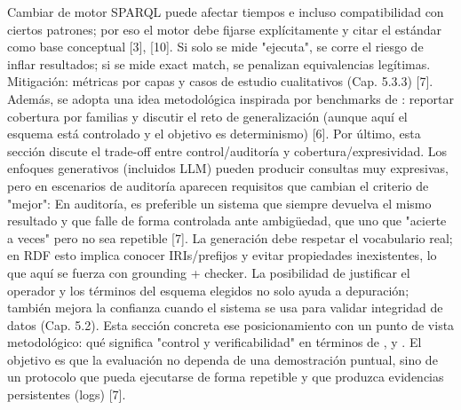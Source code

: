 \markdownRendererUlItem {} Cambiar de motor SPARQL puede afectar tiempos e incluso compatibilidad con ciertos patrones; por eso el motor debe fijarse explícitamente y citar el estándar como base conceptual [3], [10].\markdownRendererUlItemEnd 
\markdownRendererUlItem {} Si solo se mide "ejecuta", se corre el riesgo de inflar resultados; si se mide exact match, se penalizan equivalencias legítimas. Mitigación: métricas por capas y casos de estudio cualitativos (Cap. 5.3.3) [7].\markdownRendererUlItemEnd 
\markdownRendererUlEndTight \markdownRendererInterblockSeparator
{}Además, se adopta una idea metodológica inspirada por benchmarks de : reportar cobertura por familias y discutir el reto de generalización (aunque aquí el esquema está controlado y el objetivo es determinismo) [6].\markdownRendererInterblockSeparator
{}\markdownRendererInterblockSeparator
{}Por último, esta sección discute el trade-off entre control/auditoría y cobertura/expresividad. Los enfoques generativos (incluidos LLM) pueden producir consultas muy expresivas, pero en escenarios de auditoría aparecen requisitos que cambian el criterio de "mejor":\markdownRendererInterblockSeparator
{}\markdownRendererUlBeginTight
\markdownRendererUlItem {} En auditoría, es preferible un sistema que siempre devuelva el mismo resultado y que falle de forma controlada ante ambigüedad, que uno que "acierte a veces" pero no sea repetible [7].\markdownRendererUlItemEnd 
\markdownRendererUlItem {} La generación debe respetar el vocabulario real; en RDF esto implica conocer IRIs/prefijos y evitar propiedades inexistentes, lo que aquí se fuerza con grounding + checker.\markdownRendererUlItemEnd 
\markdownRendererUlItem {} La posibilidad de justificar el operador y los términos del esquema elegidos no solo ayuda a depuración; también mejora la confianza cuando el sistema se usa para validar integridad de datos (Cap. 5.2).\markdownRendererUlItemEnd 
\markdownRendererUlEndTight \markdownRendererInterblockSeparator
{}Esta sección concreta ese posicionamiento con un punto de vista metodológico: qué significa "control y verificabilidad" en términos de ,  y . El objetivo es que la evaluación no dependa de una demostración puntual, sino de un protocolo que pueda ejecutarse de forma repetible y que produzca evidencias persistentes (logs) [7].\markdownRendererInterblockSeparator
